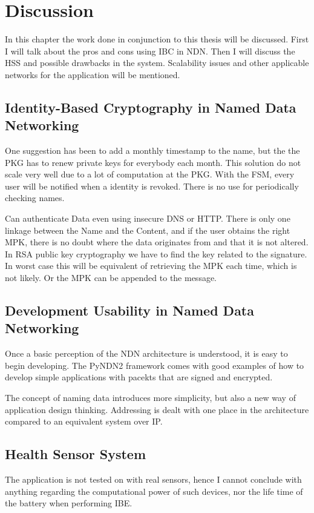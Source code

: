 \chapter{Discussion}
In this chapter the work done in conjunction to this thesis will be discussed. 
First I will talk about the pros and cons using \gls{IBC} in \gls{NDN}.
Then I will discuss the \gls{HSS} and possible drawbacks in the system. 
Scalability issues and other applicable networks for the application will be mentioned.

\section{Identity-Based Cryptography in Named Data Networking}
One suggestion has been to add a monthly timestamp to the name, but the the \gls{PKG} has to renew private keys for everybody each month. 
This solution do not scale very well due to a lot of computation at the \gls{PKG}.
With the \gls{FSM}, every user will be notified when a identity is revoked.
There is no use for periodically checking names.

Can authenticate Data even using insecure DNS or HTTP. 
There is only one linkage between the Name and the Content, and if the user obtains the right \gls{MPK}, there is no doubt where the data originates from and that it is not altered.
In RSA public key cryptography we have to find the key related to the signature. 
In worst case this will be equivalent of retrieving the \gls{MPK} each time, which is not likely. 
Or the \gls{MPK} can be appended to the message.

\section{Development Usability in Named Data Networking}
Once a basic perception of the \gls{NDN} architecture is understood, it is easy to begin developing.
The \gls{PyNDN2} framework comes with good examples of how to develop simple applications with pacekts that are signed and encrypted.

The concept of naming data introduces more simplicity, but also a new way of application design thinking.
Addressing is dealt with one place in the architecture compared to an equivalent system over \gls{IP}. 

\section{Health Sensor System}
The application is not tested on with real sensors, hence I cannot conclude with anything regarding the computational power of such devices, nor the life time of the battery when performing \gls{IBE}.  

